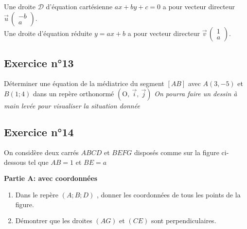 \documentclass[12pt,a4paper]{article}
\def\Oij{$\left(\text{O},~\vec{i},~\vec{j}\right)$}
\newcommand*{\Coord}[3]{%
  \ensuremath{\overrightarrow{#1}\, 
    \begin{pmatrix} 
      #2\\ 
      #3 
    \end{pmatrix}}}
\begin{document}
\begin{raps}

Une droite $\mathscr{D}$ d'équation cartésienne $ax+by+c=0$ a pour vecteur directeur $\Coord{u}{-b}{a}$.\\

Une droite d'équation réduite $y=ax+b$ a pour vecteur directeur $\Coord{v}{1}{a}$.
\end{raps}


\subsection*{Exercice n°13} 

Déterminer une équation de la médiatrice du segment $[AB]$ avec $A(3,-5)$ et $B(1;4)$ dans un repère orthonormé \Oij{}
\textit{On pourra faire un dessin à main levée pour visualiser la situation donnée}

\subsection*{Exercice n°14} 

On considère deux carrés $ABCD$ et $BEFG$ disposés comme sur la figure ci-dessous tel que $AB=1$ et $BE=a$


\begin{center}
  
\end{center}

\textbf{Partie A: avec coordonnées}
\begin{enumerate}
    \item Dans le repère $(A;B;D)$ , donner les coordonnées de tous les points de la figure.
    \item  Démontrer que les droites $(AG)$ et $(CE)$ sont perpendiculaires.
\end{enumerate}
\end{document}
